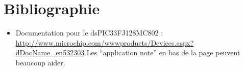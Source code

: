 \documentclass[a4,french,12pt]{article}
\begin{document}
\newpage
\section{Bibliographie}
\begin{itemize}
  \item Documentation pour le dsPIC33FJ128MC802 : \\
    \href{http://www.microchip.com/wwwproducts/Devices.aspx?dDocName=en532302}
         {http://www.microchip.com/wwwproducts/Devices.aspx?dDocName=en532303} 
    Les ``application note'' en bas de la page peuvent beaucoup aider.
\end{itemize}
\end{document}
